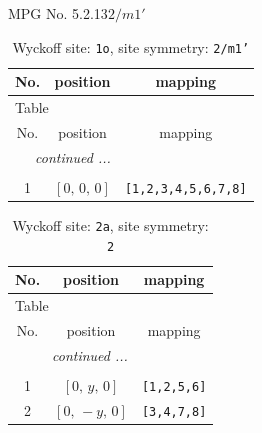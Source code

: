 \documentclass[fleqn,8pt]{jsarticle}
\begin{document}
\setcounter{MaxMatrixCols}{32}

\renewcommand{\tablename}{Table~}
\renewcommand{\figurename}{Figure~}
\begin{center}
\LARGE
MPG No. 5.2.13\quad$2/m1'$
\end{center}
\renewcommand{\arraystretch}{1.2}
\begin{longtable}{ccc}
\caption{Wyckoff site: {\tt 1o}, site symmetry: {\tt 2/m1'}}
 \\
 \hline \hline
No. & position & mapping \\ \hline \endfirsthead

\multicolumn{2}{l}{\tablename\ \thetable{}} \\
 \hline \hline
No. & position & mapping \\ \hline \endhead

 \hline \hline
\multicolumn{2}{r}{\footnotesize\it continued ...} \\ \endfoot

 \hline \hline
\multicolumn{2}{r}{} \\ \endlastfoot

1 & $\left[ 0,\, 0,\, 0 \right]$ & {\tt [1,2,3,4,5,6,7,8]} \\
\end{longtable}
\renewcommand{\arraystretch}{1.2}
\begin{longtable}{ccc}
\caption{Wyckoff site: {\tt 2a}, site symmetry: {\tt 2}}
 \\
 \hline \hline
No. & position & mapping \\ \hline \endfirsthead

\multicolumn{2}{l}{\tablename\ \thetable{}} \\
 \hline \hline
No. & position & mapping \\ \hline \endhead

 \hline \hline
\multicolumn{2}{r}{\footnotesize\it continued ...} \\ \endfoot

 \hline \hline
\multicolumn{2}{r}{} \\ \endlastfoot

1 & $\left[ 0,\, y,\, 0 \right]$ & {\tt [1,2,5,6]} \\ \hline
2 & $\left[ 0,\, - y,\, 0 \right]$ & {\tt [3,4,7,8]} \\
\end{longtable}
\renewcommand{\arraystretch}{1.2}
\end{document}
